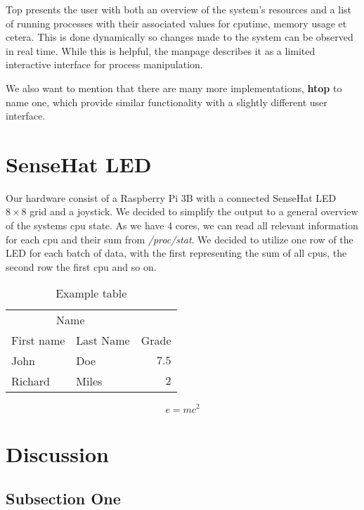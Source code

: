 \documentclass[twoside,twocolumn]{article}
\begin{document}
Top presents the user with both an overview of the system's resources and a list
of running processes with their associated values for cputime, memory usage et
cetera. This is done dynamically so changes made to the system can be observed
in real time. While this is helpful, the manpage describes it as a limited 
interactive interface for process manipulation. 

We also want to mention that there are many more implementations,
\textbf{htop} to name one, which provide similar functionality with a slightly
different user interface. 


\section{SenseHat LED}

Our hardware consist of a Raspberry Pi 3B with a connected SenseHat LED $8\times
8$ grid and a joystick. We decided to simplify the output to a general overview
of the systems cpu state. As we have 4 cores, we can read all relevant
information for each cpu and their sum from \textit{/proc/stat}. We decided to
utilize one row of the LED for each batch of data, with the first representing the
sum of all cpus, the second row the first cpu and so on. 

\begin{table}
\caption{Example table}
\centering
\begin{tabular}{llr}
\toprule
\multicolumn{2}{c}{Name} \\
\cmidrule(r){1-2}
First name & Last Name & Grade \\
\midrule
John & Doe & $7.5$ \\
Richard & Miles & $2$ \\
\bottomrule
\end{tabular}
\end{table}


\begin{equation}
\label{eq:emc}
e = mc^2
\end{equation}



\section{Discussion}

\subsection{Subsection One}
\end{document}
